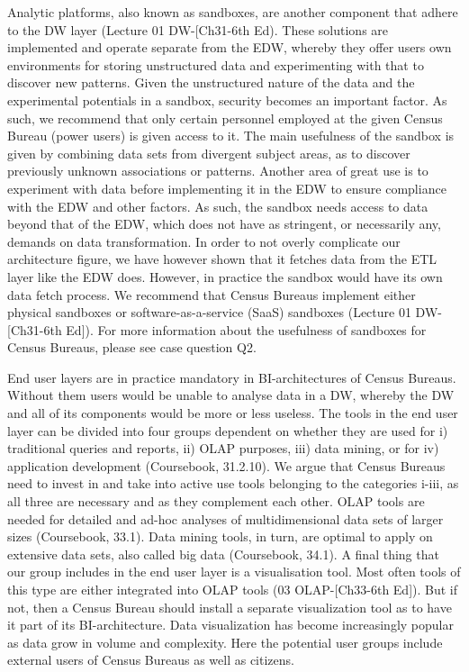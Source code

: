 Analytic platforms, also known as sandboxes, are another component that adhere to the DW layer (Lecture 01 DW-[Ch31-6th Ed). These solutions are implemented and operate separate from the EDW, whereby they offer users own environments for storing unstructured data and experimenting with that to discover new patterns. Given the unstructured nature of the data and the experimental potentials in a sandbox, security becomes an important factor. As such, we recommend that only certain personnel employed at the given Census Bureau (power users) is given access to it.  The main usefulness of the sandbox is given by combining data sets from divergent subject areas, as to discover previously unknown associations or patterns. Another area of great use is to experiment with data before implementing it in the EDW to ensure compliance with the EDW and other factors. As such, the sandbox needs access to data beyond that of the EDW, which does not have as stringent, or necessarily any, demands on data transformation. In order to not overly complicate our architecture figure, we have however shown that it fetches data from the ETL layer like the EDW does. However, in practice the sandbox would have its own data fetch process. We recommend that Census Bureaus implement either physical sandboxes or software-as-a-service (SaaS) sandboxes (Lecture 01 DW-[Ch31-6th Ed]). For more information about the usefulness of sandboxes for Census Bureaus, please see case question Q2.  

 

End user layers are in practice mandatory in BI-architectures of Census Bureaus. Without them users would be unable to analyse data in a DW, whereby the DW and all of its components would be more or less useless. The tools in the end user layer can be divided into four groups dependent on whether they are used for i) traditional queries and reports, ii) OLAP purposes, iii) data mining, or for iv) application development (Coursebook, 31.2.10). We argue that Census Bureaus need to invest in and take into active use tools belonging to the categories i-iii, as all three are necessary and as they complement each other. OLAP tools are needed for detailed and ad-hoc analyses of multidimensional data sets of larger sizes (Coursebook, 33.1). Data mining tools, in turn, are optimal to apply on extensive data sets, also called big data (Coursebook, 34.1).  A final thing that our group includes in the end user layer is a visualisation tool. Most often tools of this type are either integrated into OLAP tools (03 OLAP-[Ch33-6th Ed]). But if not, then a Census Bureau should install a separate visualization tool as to have it part of its BI-architecture. Data visualization has become increasingly popular as data grow in volume and complexity. Here the potential user groups include external users of Census Bureaus as well as citizens.  
